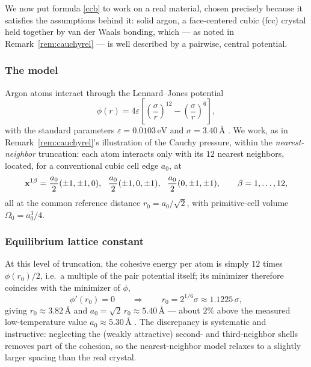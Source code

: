 We now put formula \eqref{ccb} to work on a real material, chosen precisely because it satisfies the assumptions behind it: solid argon, a face-centered cubic (fcc) crystal held together by van der Waals bonding, which --- as noted in Remark~\ref{rem:cauchyrel} --- is well described by a pairwise, central potential.

\subsubsection*{The model}

Argon atoms interact through the Lennard--Jones potential
\begin{equation}
	\phi(r) = 4\varepsilon\left[\left(\frac{\sigma}{r}\right)^{12} - \left(\frac{\sigma}{r}\right)^{6}\right],
\end{equation}
with the standard parameters $\varepsilon = 0.0103\,\mathrm{eV}$ and $\sigma = 3.40\,\text{\AA}$ \cite{AshcroftMermin}. We work, as in Remark~\ref{rem:cauchyrel}'s illustration of the Cauchy pressure, within the \textit{nearest-neighbor} truncation: each atom interacts only with its $12$ nearest neighbors, located, for a conventional cubic cell edge $a_0$, at
\begin{equation}
	\xb^{1\beta} = \frac{a_0}{2}(\pm1,\pm1,0),\ \ \frac{a_0}{2}(\pm1,0,\pm1),\ \ \frac{a_0}{2}(0,\pm1,\pm1), \qquad \beta=1,\ldots,12,
\end{equation}
all at the common reference distance $r_0 = a_0/\sqrt2$, with primitive-cell volume $\Omega_0 = a_0^3/4$.

\subsubsection*{Equilibrium lattice constant}

At this level of truncation, the cohesive energy per atom is simply $12$ times $\phi(r_0)/2$, i.e.\ a multiple of the pair potential itself; its minimizer therefore coincides with the minimizer of $\phi$,
\begin{equation}
	\phi'(r_0)=0 \qquad\Longrightarrow\qquad r_0 = 2^{1/6}\sigma \approx 1.1225\,\sigma,
\end{equation}
giving $r_0 \approx 3.82\,\text{\AA}$ and $a_0=\sqrt2\,r_0\approx5.40\,\text{\AA}$ --- about $2\%$ above the measured low-temperature value $a_0\approx5.30\,\text{\AA}$ \cite{KeelerBatchelder1970}. The discrepancy is systematic and instructive: neglecting the (weakly attractive) second- and third-neighbor shells removes part of the cohesion, so the nearest-neighbor model relaxes to a slightly larger spacing than the real crystal.

